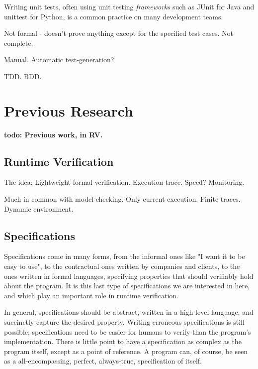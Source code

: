 \documentclass[a4paper,11pt]{kth-mag}
\newcommand{\todo}[1]{\textbf{todo: #1}}
\begin{document}
Writing unit tests, often using unit testing \textit{frameworks} such as JUnit \cite{junit}
for Java and unittest \cite{python-unittest} for Python, is a common practice on many
development teams.

Not formal - doesn't prove anything except for the specified test cases. Not complete.

Manual. Automatic test-generation?

TDD. BDD.





\pagestyle{newchap}
\chapter{Previous Research}

\todo{Previous work, in RV.}




\section{Runtime Verification}

The idea: Lightweight formal verification. Execution trace. Speed? Monitoring.

Much in common with model checking. Only current execution. Finite traces. Dynamic environment. 

\section{Specifications}

Specifications come in many forms, from the informal ones like "I want it to be easy to use", to the
contractual ones written by companies and clients, to the ones written in formal languages, specifying properties that should verifiably hold about the program. It is this last type of specifications we are interested in here, and which play an important role in runtime verification.

In general, specifications should be abstract, written in a high-level language, and succinctly
capture the desired property. Writing erroneous specifications is still possible; specifications need
to be easier for humans to verify than the program's implementation. There is little point to have
a specification as complex as the program itself, except as a point of reference. A program can,
of course, be seen as a all-encompassing, perfect, always-true, specification of itself.
\end{document}
